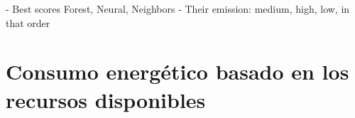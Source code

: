 - Best scores Forest, Neural, Neighbors
- Their emission: medium, high, low, in that order


\section{Consumo energético basado en los recursos disponibles}



\clearpage
